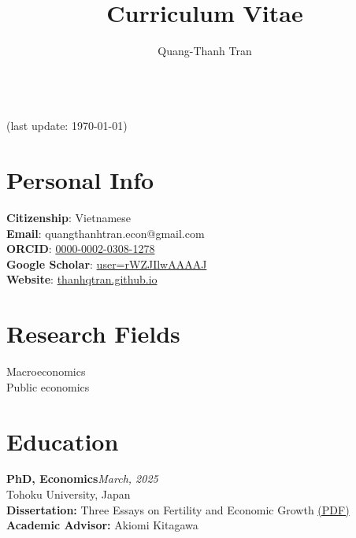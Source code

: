 \documentclass[12pt]{article}
\newcommand{\cvcolor}{\color{DodgerBlue4}} %
\renewcommand{\maketitle}{
\begin{center}
{\Huge\theauthor}\\
{\color{Gray}(last update: \today)}
\end{center}
}
\begin{document}
\title{Curriculum Vitae} %
\author{Quang-Thanh Tran}

\maketitle


\section{Personal Info}
\textbf{Citizenship}: Vietnamese \\
\textbf{Email}: quangthanhtran.econ@gmail.com \\
\textbf{ORCID}: \href{https://orcid.org/0000-0002-0308-1278}{0000-0002-0308-1278}\\
\textbf{Google Scholar}: \href{https://scholar.google.com/citations?user=rWZJIlwAAAAJ&hl=en}{user=rWZJIlwAAAAJ}\\
\textbf{Website}: \href{https://thanhqtran.github.io}{thanhqtran.github.io} \\


\section{Research Fields}
Macroeconomics \\
Public economics





\section{Education}

\textbf{PhD, Economics}\hfill\emph{March, 2025}\\
Tohoku University, Japan \\
\textbf{Dissertation:} Three Essays on Fertility and Economic Growth \href{https://tohoku.repo.nii.ac.jp/record/2003894/files/250325-TRAN-221-1.pdf}{(PDF)}\\
\textbf{Academic Advisor:} Akiomi Kitagawa
\end{document}
